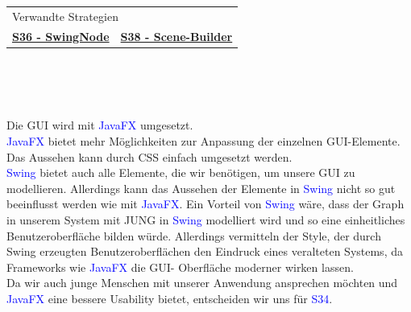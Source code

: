 \documentclass[enabledeprecatedfontcommands,fontsize=11pt,paper=a4,twoside]{scrartcl}
\newcounter{one}
\newcommand{\cb}[1]{{\textcolor{blue}{#1}}}
\begin{document}
\begin{tabular} {|p{8cm} p{8cm}|}
	\hline
	\multicolumn{2}{|l|}{Verwandte Strategien} \\
	\textbf{\hyperlink{lll}{S36 - SwingNode}}&
	\textbf{\hyperlink{mmm}{S38 - Scene-Builder}}\\
	\hline
\end{tabular}\\ \\ \\
\begin{onehalfspace}
	Die GUI wird mit \cb{JavaFX} umgesetzt. \\
	\cb{JavaFX} bietet mehr Möglichkeiten zur Anpassung der einzelnen GUI-Elemente. Das Aussehen kann durch CSS einfach umgesetzt werden. \\
	\cb{Swing} bietet auch alle Elemente, die wir benötigen, um unsere GUI zu modellieren. Allerdings kann das Aussehen der Elemente in \cb{Swing} nicht so gut beeinflusst werden wie mit \cb{JavaFX}. Ein Vorteil von \cb{Swing} wäre, dass der Graph in unserem System mit JUNG in \cb{Swing} modelliert wird und so eine einheitliches Benutzeroberfläche bilden würde. Allerdings vermitteln der Style, der durch Swing erzeugten Benutzeroberflächen den Eindruck eines veralteten Systems, da Frameworks wie \cb{JavaFX} die GUI- Oberfläche moderner wirken lassen. \\
	Da wir auch junge Menschen mit unserer Anwendung ansprechen möchten und \cb{JavaFX} eine bessere Usability bietet, entscheiden wir uns für \cb{S34}.
\end{onehalfspace}
\newpage
\end{document}
